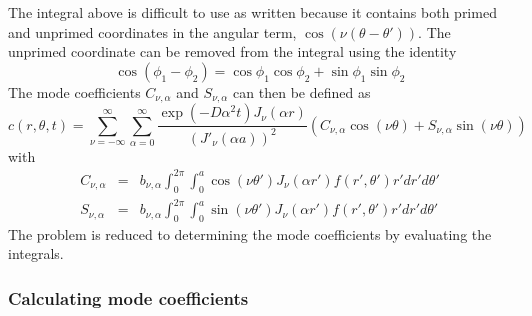 The integral above is difficult to use as written because it contains both primed and unprimed coordinates in the angular term, $\cos\left(\nu(\theta -\theta')\right)$.  The unprimed coordinate can be removed from the integral using the identity $$\cos(\phi_1-\phi_2) = \cos\phi_1\cos\phi_2 + \sin\phi_1\sin\phi_2$$ The mode coefficients $C_{\nu,\alpha}$ and $S_{\nu,\alpha}$ can then be defined as
\begin{equation}
c(r,\theta,t) = \sum_{\nu=-\infty}^{\infty} \sum_{\alpha = 0}^\infty   \frac{\exp\left(-D\alpha^2t\right)J_\nu\left(\alpha r\right)}{\left(J'_\nu (\alpha a)\right)^2} \left(C_{\nu,\alpha}\cos(\nu\theta) + S_{\nu,\alpha} \sin(\nu\theta)\right)
\label{eq:c-s-series}
\end{equation}
with 
\begin{eqnarray}
C_{\nu,\alpha} & = &b_{\nu,\alpha} \int_0^{2\pi} \int_0^a \cos\left(\nu\theta'\right) J_\nu(\alpha r')f(r',\theta') r' dr' d\theta' \label{eq:cos-defn}\\
S_{\nu,\alpha} & = & b_{\nu,\alpha}\int_0^{2\pi} \int_0^a \sin\left(\nu\theta'\right) J_\nu(\alpha r') f(r',\theta') r' dr' d\theta' \label{eq:sin-defn}
\end{eqnarray}
The problem is reduced to determining the mode coefficients by evaluating the integrals.

\subsubsection{Calculating mode coefficients}
\label{sec:calcCoeffs}

